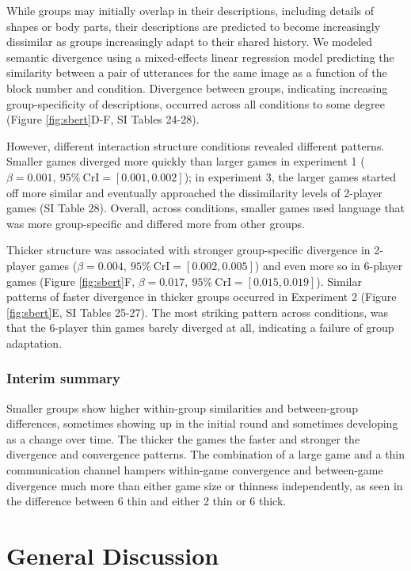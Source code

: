 \documentclass[
  english,
]{article}
\begin{document}
While groups may initially overlap in their descriptions, including details of shapes or body parts, their descriptions are predicted to become increasingly dissimilar as groups increasingly adapt to their shared history.
We modeled semantic divergence using a mixed-effects linear regression model predicting the similarity between a pair of utterances for the same image as a function of the block number and condition.
Divergence between groups, indicating increasing group-specificity of descriptions, occurred across all conditions to some degree (Figure \ref{fig:sbert}D-F, SI Tables 24-28).

However, different interaction structure conditions revealed different patterns.
Smaller games diverged more quickly than larger games in experiment 1 (\(\beta=0.001,\:95\%\:\mathrm{CrI}=[0.001, 0.002]\)); in experiment 3, the larger games started off more similar and eventually approached the dissimilarity levels of 2-player games (SI Table 28). Overall, across conditions, smaller games used language that was more group-specific and differed more from other groups.

Thicker structure was associated with stronger group-specific divergence in 2-player games (\(\beta=0.004,\:95\%\:\mathrm{CrI}=[0.002, 0.005]\)) and even more so in 6-player games (Figure \ref{fig:sbert}F, \(\beta=0.017,\:95\%\:\mathrm{CrI}=[0.015, 0.019]\)). Similar patterns of faster divergence in thicker groups occurred in Experiment 2 (Figure \ref{fig:sbert}E, SI Tables 25-27).
The most striking pattern across conditions, was that the 6-player thin games barely diverged at all, indicating a failure of group adaptation.

\hypertarget{interim-summary-1}{%
\subsubsection{Interim summary}\label{interim-summary-1}}

Smaller groups show higher within-group similarities and between-group differences, sometimes showing up in the initial round and sometimes developing as a change over time. The thicker the games the faster and stronger the divergence and convergence patterns. The combination of a large game and a thin communication channel hampers within-game convergence and between-game divergence much more than either game size or thinness independently, as seen in the difference between 6 thin and either 2 thin or 6 thick.

\hypertarget{general-discussion}{%
\section{General Discussion}\label{general-discussion}}
\end{document}
